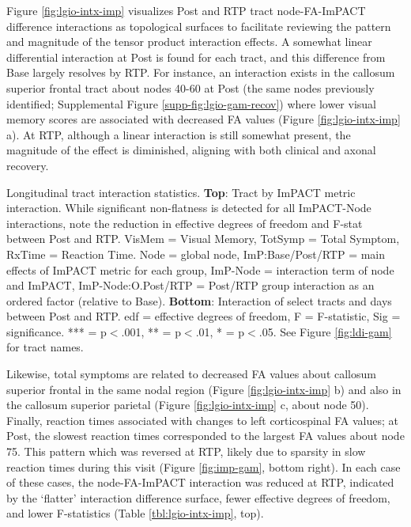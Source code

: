 \documentclass[12pt]{article}
\begin{document}
Figure \ref{fig:lgio-intx-imp} visualizes Post and RTP tract node-FA-ImPACT difference interactions as topological surfaces to facilitate reviewing the pattern and magnitude of the tensor product interaction effects. A somewhat linear differential interaction at Post is found for each tract, and this difference from Base largely resolves by RTP. For instance, an interaction exists in the callosum superior frontal tract about nodes 40-60 at Post (the same nodes previously identified; Supplemental Figure \ref{supp-fig:lgio-gam-recov}) where lower visual memory scores are associated with decreased FA values (Figure \ref{fig:lgio-intx-imp} a). At RTP, although a linear interaction is still somewhat present, the magnitude of the effect is diminished, aligning with both clinical and axonal recovery.

\begin{table}[H]
	\scriptsize
	
	\caption{Longitudinal tract interaction statistics. \textbf{Top}: Tract by ImPACT metric interaction. While significant non-flatness is detected for all ImPACT-Node interactions, note the reduction in effective degrees of freedom and F-stat between Post and RTP. VisMem = Visual Memory, TotSymp = Total Symptom, RxTime = Reaction Time. Node = global node, ImP:Base/Post/RTP = main effects of ImPACT metric for each group, ImP-Node = interaction term of node and ImPACT, ImP-Node:O.Post/RTP = Post/RTP group interaction as an ordered factor (relative to Base). \textbf{Bottom}: Interaction of select tracts and days between Post and RTP. edf = effective degrees of freedom, F = F-statistic, Sig = significance. *** = p$<$.001, ** = p$<$.01, * = p$<$.05. See Figure \ref{fig:ldi-gam} for tract names.}
	\label{tbl:lgio-intx-imp}
\end{table}

Likewise, total symptoms are related to decreased FA values about callosum superior frontal in the same nodal region (Figure \ref{fig:lgio-intx-imp} b) and also in the callosum superior parietal (Figure \ref{fig:lgio-intx-imp} c, about node 50). Finally, reaction times associated with changes to left corticospinal FA values; at Post, the slowest reaction times corresponded to the largest FA values about node 75. This pattern which was reversed at RTP, likely due to sparsity in slow reaction times during this visit (Figure \ref{fig:imp-gam}, bottom right). In each case of these cases, the node-FA-ImPACT interaction was reduced at RTP, indicated by the `flatter' interaction difference surface, fewer effective degrees of freedom, and lower F-statistics (Table \ref{tbl:lgio-intx-imp}, top).
\end{document}
